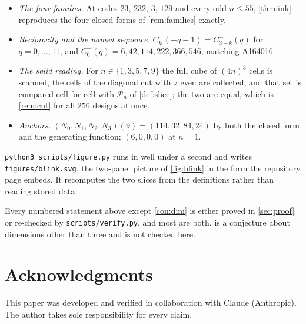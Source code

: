 \documentclass[11pt]{amsart}
\theoremstyle{definition}
\theoremstyle{remark}
\begin{document}
\begin{itemize}
\item \emph{The four families.} At codes $23$, $232$, $3$, $129$ and every odd $n \le 55$, \cref{thm:ink} reproduces the four closed forms of \cref{rem:families} exactly.
\item \emph{Reciprocity and the named sequence.} $C^{+}_k(-q-1) = C^{-}_{3-k}(q)$ for $q = 0,\dots,11$, and $C^{+}_0(q) = 6,42,114,222,366,546$, matching A164016.
\item \emph{The solid reading.} For $n \in \{1,3,5,7,9\}$ the full cube of $(4n)^3$ cells is scanned, the cells of the diagonal cut with $z$ even are collected, and that set is compared cell for cell with $\mathcal{P}_n$ of \cref{def:slice}; the two are equal, which is \cref{rem:cut} for all $256$ designs at once.
\item \emph{Anchors.} $(N_0,N_1,N_2,N_3)(9) = (114,32,84,24)$ by both the closed form and the generating function; $(6,0,0,0)$ at $n=1$.
\end{itemize}

\texttt{python3 scripts/figure.py} runs in well under a second and writes \texttt{figures/blink.svg}, the two-panel picture of \cref{fig:blink} in the form the repository page embeds. It recomputes the two slices from the definitions rather than reading stored data.

Every numbered statement above except \cref{con:dim} is either proved in \cref{sec:proof} or re-checked by \texttt{scripts/verify.py}, and most are both.  is a conjecture about dimensions other than three and is not checked here.

\section*{Acknowledgments}

This paper was developed and verified in collaboration with Claude (Anthropic). The author takes sole responsibility for every claim.
\end{document}
